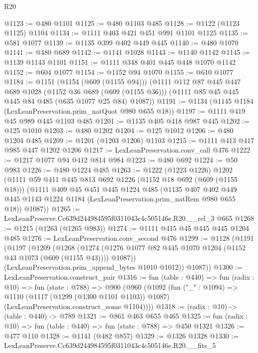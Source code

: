 \begin{lexlean}{R20}
\begin{coremodule}
@1123 := @480 @1101
@1125 := @480 @1103 @485
@1128 := @1122 (@1123 @1125) @1104
@1134 := @1111 @403 @421 @451 @991 @1101 @1125
@1135 := @581 @1077
@1139 := @1135 @399 @402 @449 @445
@1140 := @480 @1070
@1141 := @480 @689
@1142 := @1141 @1028
@1143 := @1140 @1142
@1145 := @1139 @1143 @1101
@1151 := @1111 @348 @401 @445 @448 @1070 @1142
@1152 := @604 @1077
@1154 := @1152 @94 @1070
@1155 := @610 @1077
@1184 := @1151
    (@1154 (@609 (@1155 @94)))
    (@1111
      @112
      @87
      @445
      @447
      @689
      @1028
      (@1152 @36 @689 (@609 (@1155 @36)))
      (@1111 @85 @45 @445 @445 @84 @485 (@635 @1077 @25 @84) @1087))
@1191 := @1134 (@1145 @1184 (LexLeanPreservation.prim_natQuot @980 @655 @18))
@1197 := @1111 @419 @45 @989 @445 @1103 @485
@1201 := @1135 @405 @418 @987 @445
@1202 := @125 @1010
@1203 := @480 @1202
@1204 := @125 @1012
@1206 := @480 @1204 @485
@1209 := @1201 (@1203 @1206) @1103
@1215 := @1111 @413 @417 @985 @447 @1202 @1206
@1217 := LexLeanPreservation.conv_call @476
@1222 := @1217 @1077 @94 @412 @814 @984
@1223 := @480 @692
@1224 := @50 @983
@1226 := @480 @1224 @485
@1263 := @1222
    (@1223 @1226)
    @1202
    (@1111
      @59
      @411
      @445
      @813
      @692
      @1226
      (@1152 @18 @692 (@609 (@1155 @18)))
      (@1111
        @409
        @45
        @451
        @445
        @1224
        @485
        (@1135
          @407
          @402
          @449
          @445
          @1143
          @1224
          @1184
          (LexLeanPreservation.prim_natRem @980 @655 @18))
        @1087))
@1265 := LexLeanPreserve.Cc639d244984595f0311043c4c505146e.R20.__rel_3 @665
@1268 := @1215 (@1263 (@1265 @983))
@1274 := @1111 @415 @45 @445 @445 @1204 @485
@1276 := LexLeanPreservation.conv_second @476
@1299 := @1128
    (@1191
      (@1197
        (@1209
          (@1268
            (@1274 (@1276 @1077 @82 @445 @1070 @1204 (@1152 @43 @1073 (@609 (@1155 @43)))) @1087))
          (LexLeanPreservation.prim_append_bytes @1010 @1012))
        @1087))
@1300 := LexLeanPreservation.construct_pair
@1316 := fun (table : @440) =>
  fun (radix : @10) =>
  fun (state : @788) =>
  @900
    (@960
      (@1092
        (fun ("_" : @1094) =>
        @1110
          (@1117 (@1299 (@1300 @1101 @1103)) @1087)
          (LexLeanPreservation.construct_some @1104))))
@1318 := (radix : @10) -> (table : @440) -> @789
@1321 := @861 @463 @655 @465
@1325 := fun (radix : @10) => fun (table : @440) => fun (state : @788) => @450 @1321
@1326 := @477 @110
@1328 := @1141 (@482 @857)
@1329 := @1326 @1328
@1330 := LexLeanPreserve.Cc639d244984595f0311043c4c505146e.R20.__fits_5

\end{coremodule}
\end{lexlean}

